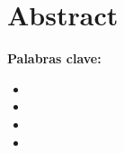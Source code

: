 \section{Abstract}

{\bf Palabras clave:}
\begin{itemize} 
    \item
    \item
    \item
    \item
\end{itemize}
